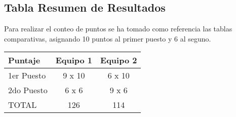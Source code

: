 \subsection{Tabla Resumen de Resultados}
Para realizar el conteo de puntos se ha tomado como referencia las tablas comparativas, asignando 10 puntos al primer puesto y 6 al seguno.

\begin{center}
\begin{tabular}{|lcc|} \hline
\footnotesize\textbf{Puntaje} & \footnotesize\textbf{Equipo 1} & \footnotesize\textbf{Equipo 2} \\\hline
1er Puesto & 9 x 10 & 6 x 10 \\\hline
2do Puesto & 6 x 6 & 9 x 6 \\\hline
TOTAL & 126 & 114 \\\hline
\end{tabular}
\end{center}
